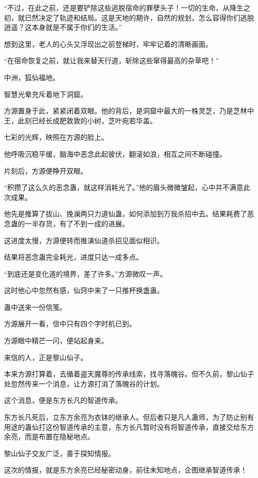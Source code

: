 \begin{this_body}
“不过，在此之前，还是要铲除这些逃脱宿命的罪孽头子！一切的生命，从降生之初，就已然决定了轨迹和结局。这是天地的期许，自然的规划，怎么容得你们逃脱逍遥？这本身就是不属于你们的生活。”

想到这里，老人的心头又浮现出之前登梯时，牢牢记着的清晰画面。

“在宿命恢复之前，就让我来替天行道，斩除这些窜得最高的杂草吧！”

中洲，狐仙福地。

智慧光晕充斥着地下洞窟。

方源置身于此，紧紧闭着双眼。他的背后，是洞窟中最大的一株灵芝，乃是芝林中王，此刻已经长成肥敦敦的小树，芝叶宛若华盖。

七彩的光辉，映照在方源的脸上。

他呼吸沉稳平缓，脑海中恶念此起彼伏，翻滚如浪，相互之间不断碰撞。

片刻后，方源便睁开双眼。

“积攒了这么久的恶念蛊，就这样消耗光了。”他的眉头微微皱起，心中并不满意此次成果。

他先是推算了拔山、挽澜两只力道仙蛊，如何添加到万我杀招中去。结果耗费了恶念蛊的一半存货，有了不到一成的进展。

这进度太慢，方源便转而推演仙道杀招见面似相识。

结果将恶念蛊完全耗光，进度只达一成多点。

“到底还是变化道的境界，差了许多。”方源微叹一声。

这时他心中忽然有感，仙窍中来了一只推杯换盏蛊。

蛊中送来一份信笺。

方源展开一看，信中只有四个字时机已到。

方源眼中精芒一闪，便站起身来。

来信的人，正是黎山仙子。

本来方源打算着，去循着盗天魔尊的传承线索，找寻落魄谷。但不久前，黎山仙子处忽然传来一个消息，让方源打消了落魄谷的计划。

这个消息，便是东方长凡的智道传承。

东方长凡死后，立东方余亮为衣钵的继承人。但后者只是凡人蛊师，为了防止别有用途的蛊仙打这份智道传承的主意，东方长凡暂时没有将智道传承，直接交给东方余亮，而是布置在隐秘地点。

黎山仙子交友广泛，善于探知情报。

这次的情报，就是东方余亮已经秘密动身，前往未知地点，企图继承智道传承！

\end{this_body}

